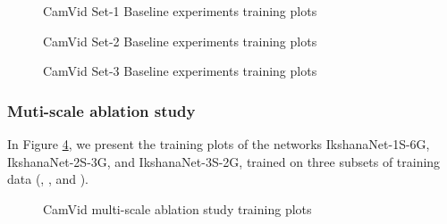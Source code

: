 \documentclass{article}
\begin{document}
\begin{figure}[ht]
\centering     {}
\caption{CamVid Set-1 Baseline experiments training plots}
\label{C4}
\end{figure}

\begin{figure}[ht]
\centering
{}
\caption{CamVid Set-2 Baseline experiments training plots}
\label{C5}
\end{figure}

\begin{figure}[ht]
\centering
{}
\caption{CamVid Set-3 Baseline experiments training plots}
\label{C6}
\end{figure}

\subsubsection{Muti-scale ablation study}
In Figure \ref{C7}, we present the training plots of the networks IkshanaNet-1S-6G,  IkshanaNet-2S-3G, and IkshanaNet-3S-2G, trained on three subsets of training data (, , and ). 
\begin{figure}[ht]
\centering     {}
\caption{CamVid multi-scale ablation study training plots}
\label{C7}
\end{figure}
\end{document}
